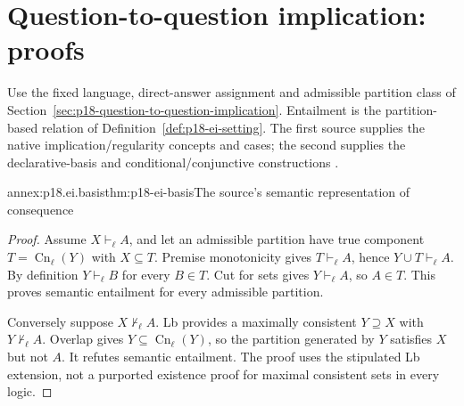 \section{Question-to-question implication: proofs}
\label{sec:p18-erotetic-implication-annex}

Use the fixed language, direct-answer assignment and admissible partition class
of Section~\ref{sec:p18-question-to-question-implication}. Entailment is the
partition-based relation of Definition~\ref{def:p18-ei-setting}. The first
source supplies the native implication/regularity concepts and cases; the
second supplies the declarative-basis and conditional/conjunctive constructions
\cite[secs.~4,7--8]{Wisniewski2001QuestionsInferences}
\cite[secs.~2--5]{Wisniewski2018DeductionReduction}.

\begin{annexitem}{annex:p18.ei.basis}{thm:p18-ei-basis}{The source's semantic representation of consequence}
\begin{proof}
Assume \(X\vdash_\ell A\), and let an admissible partition have true
component \(T=\operatorname{Cn}_\ell(Y)\) with \(X\subseteq T\).
Premise monotonicity gives \(T\vdash_\ell A\), hence
\(Y\cup T\vdash_\ell A\). By definition \(Y\vdash_\ell B\) for every
\(B\in T\). Cut for sets gives \(Y\vdash_\ell A\), so \(A\in T\).
This proves semantic entailment for every admissible partition.

Conversely suppose \(X\not\vdash_\ell A\). Lb provides a maximally
consistent \(Y\supseteq X\) with \(Y\not\vdash_\ell A\). Overlap gives
\(Y\subseteq\operatorname{Cn}_\ell(Y)\), so the partition generated by
\(Y\) satisfies \(X\) but not \(A\). It refutes semantic entailment.
The proof uses the stipulated Lb extension, not a purported existence proof
for maximal consistent sets in every logic.
\end{proof}
\end{annexitem}

